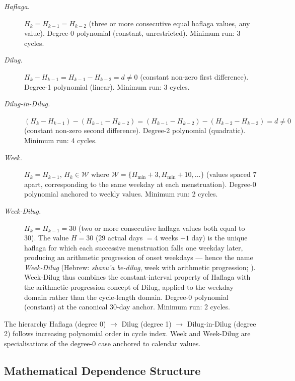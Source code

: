 \documentclass[12pt]{article}
\begin{document}
\begin{description}
  \item[\textit{Haflaga.}] $H_k = H_{k-1} = H_{k-2}$ (three or more consecutive
    equal haflaga values, any value). Degree-0 polynomial (constant, unrestricted).
    Minimum run: 3 cycles.

  \item[\textit{Dilug.}] $H_k - H_{k-1} = H_{k-1} - H_{k-2} = d \neq 0$ (constant
    non-zero first difference). Degree-1 polynomial (linear).
    Minimum run: 3 cycles.

  \item[\textit{Dilug-in-Dilug.}] $(H_k - H_{k-1}) - (H_{k-1} - H_{k-2}) =
    (H_{k-1} - H_{k-2}) - (H_{k-2} - H_{k-3}) = d \neq 0$ (constant non-zero second
    difference). Degree-2 polynomial (quadratic). Minimum run: 4 cycles.

  \item[\textit{Week.}] $H_k = H_{k-1}$, $H_k \in \mathcal{W}$ where
    $\mathcal{W} = \{H_{\min}+3, H_{\min}+10, \ldots\}$ (values spaced 7 apart,
    corresponding to the same weekday at each menstruation).
    Degree-0 polynomial anchored to weekly values. Minimum run: 2 cycles.

  \item[\textit{Week-Dilug.}] $H_k = H_{k-1} = 30$ (two or more consecutive haflaga values
    both equal to 30). The value $H = 30$ (29 actual days $= 4$ weeks $+ 1$ day) is
    the unique haflaga for which each successive menstruation falls one weekday later,
    producing an arithmetic progression of onset weekdays --- hence the name
    \textit{Week-Dilug} (Hebrew: \textit{shavu'a be-dilug}, week with arithmetic
    progression; \cite{anon2022phd}). Week-Dilug thus
    combines the constant-interval property of Haflaga with the arithmetic-progression
    concept of Dilug, applied to the weekday domain rather than the cycle-length domain.
    Degree-0 polynomial (constant) at the canonical 30-day anchor. Minimum run: 2 cycles.
\end{description}

The hierarchy Haflaga (degree 0) $\to$ Dilug (degree 1) $\to$ Dilug-in-Dilug
(degree 2) follows increasing polynomial order in cycle index. Week and Week-Dilug
are specialisations of the degree-0 case anchored to calendar values.

\subsection{Mathematical Dependence Structure}
\label{sec:mathdep}
\end{document}
